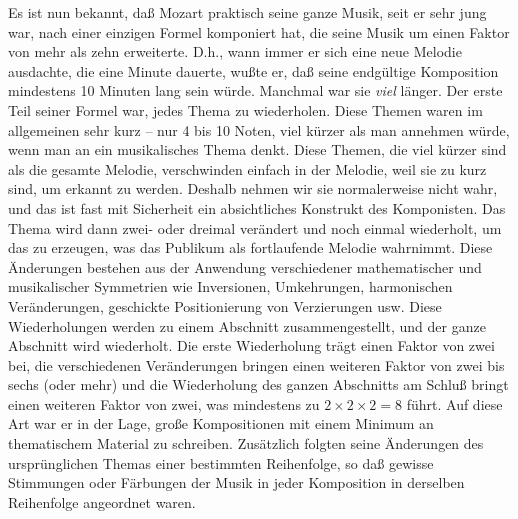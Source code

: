 Es ist nun bekannt, daß Mozart praktisch seine ganze Musik, seit er sehr jung war, nach einer einzigen Formel komponiert hat, die seine Musik um einen Faktor von mehr als zehn erweiterte.
D.h., wann immer er sich eine neue Melodie ausdachte, die eine Minute dauerte, wußte er, daß seine endgültige Komposition mindestens 10 Minuten lang sein würde.
Manchmal war sie \textit{viel} länger.
Der erste Teil seiner Formel war, jedes Thema zu wiederholen.
Diese Themen waren im allgemeinen sehr kurz -- nur 4 bis 10 Noten, viel kürzer als man annehmen würde, wenn man an ein musikalisches Thema denkt.
Diese Themen, die viel kürzer sind als die gesamte Melodie, verschwinden einfach in der Melodie, weil sie zu kurz sind, um erkannt zu werden.
Deshalb nehmen wir sie normalerweise nicht wahr, und das ist fast mit Sicherheit ein absichtliches Konstrukt des Komponisten.
Das Thema wird dann zwei- oder dreimal verändert und noch einmal wiederholt, um das zu erzeugen, was das Publikum als fortlaufende Melodie wahrnimmt.
Diese Änderungen bestehen aus der Anwendung verschiedener mathematischer und musikalischer Symmetrien wie Inversionen, Umkehrungen, harmonischen Veränderungen, geschickte Positionierung von Verzierungen usw.
Diese Wiederholungen werden zu einem Abschnitt zusammengestellt, und der ganze Abschnitt wird wiederholt.
Die erste Wiederholung trägt einen Faktor von zwei bei, die verschiedenen Veränderungen bringen einen weiteren Faktor von zwei bis sechs (oder mehr) und die Wiederholung des ganzen Abschnitts am Schluß bringt einen weiteren Faktor von zwei, was mindestens zu $2\times2\times2 = 8$ führt.
Auf diese Art war er in der Lage, große Kompositionen mit einem Minimum an thematischem Material zu schreiben.
Zusätzlich folgten seine Änderungen des ursprünglichen Themas einer bestimmten Reihenfolge, so daß gewisse Stimmungen oder Färbungen der Musik in jeder Komposition in derselben Reihenfolge angeordnet waren.

